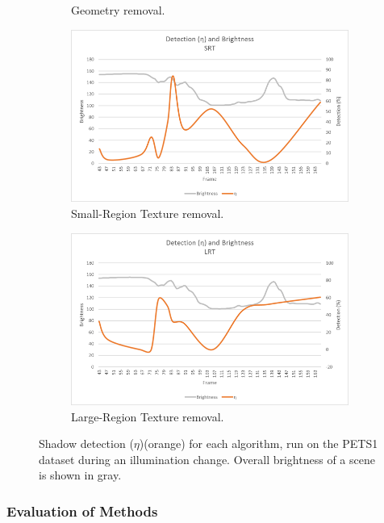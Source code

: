 \begin{figure}
\begin{subfigure}{.32\linewidth}
  \caption{Geometry removal.}
\end{subfigure}
\hfill
\begin{subfigure}{.32\linewidth}
  \includegraphics[width=1\linewidth]{figures/selectinganalgorithm_srt.jpg}
  \caption{Small-Region Texture removal.}
\end{subfigure}
\begin{subfigure}{.32\linewidth}
  \includegraphics[width=1\linewidth]{figures/selectinganalgorithm_lrt.jpg}
  \caption{Large-Region Texture removal.}
\end{subfigure}

\caption{Shadow detection ($\eta$)(orange) for each algorithm, run on the PETS1 dataset during an illumination change. Overall brightness of a scene is shown in gray.}
\label{fig:selectinganalgorithm}
\end{figure}

\FloatBarrier
\subsubsection{Evaluation of Methods}

